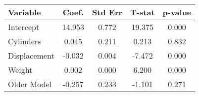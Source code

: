 \begin{tabular}{lcccc}

\hline\hline
Variable&Coef.&Std Err&T-stat&p-value\\\hline
Intercept&14.953&0.772&19.375&0.000\\
Cylinders&0.045&0.211&0.213&0.832\\
Displacement&-0.032&0.004&-7.472&0.000\\
Weight&0.002&0.000&6.200&0.000\\
Older Model&-0.257&0.233&-1.101&0.271\\
\hline
\end{tabular}
